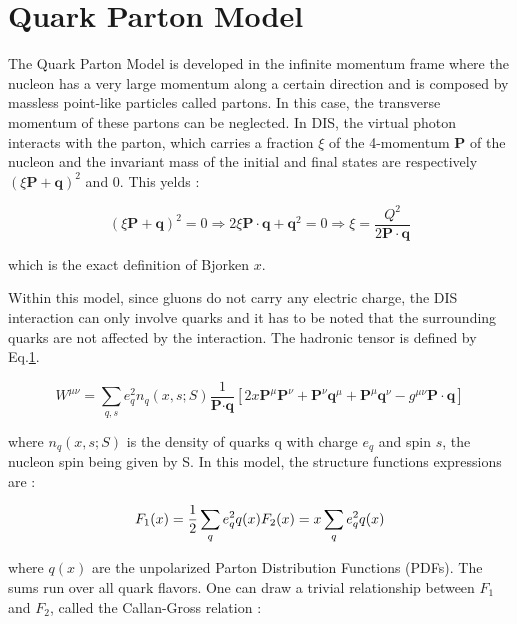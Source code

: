 
\section{Quark Parton Model}

The Quark Parton Model is developed in the infinite momentum frame where the nucleon has a very large momentum
along a certain direction and is composed by massless point-like particles called partons. In this case, the
transverse momentum of these partons can be neglected. In DIS, the virtual photon interacts with the parton,
which carries a fraction $\xi$ of the 4-momentum \textbf{P} of the nucleon and the invariant mass of the initial
and final states are respectively $(\xi\textbf{P}+\textbf{q})^2$ and 0. This yelds :

\begin{equation}
  (\xi\textbf{P}+\textbf{q})^2 = 0 \Rightarrow 2\xi\textbf{P}\cdot\textbf{q}+\textbf{q}^2 = 0 \Rightarrow \xi = \frac{Q^2}{2\textbf{P}\cdot\textbf{q}}
\end{equation}

which is the exact definition of Bjorken $x$.

Within this model, since gluons do not carry any electric charge, the DIS interaction can only involve quarks and
it has to be noted that the surrounding quarks are not affected by the interaction. The hadronic tensor is defined
by Eq.\ref{}.

\begin{equation}
  W^{\mu\nu} = \sum\limits_{q,s}e^2_qn_q(x,s;S)\frac{1}{\textbf{P}\cdot\textbf{q}}[2x\textbf{P}^{\mu}\textbf{P}^{\nu}
  +\textbf{P}^{\nu}\textbf{q}^{\mu}+\textbf{P}^{\mu}\textbf{q}^{\nu}-g^{\mu\nu}\textbf{P}\cdot\textbf{q}]
\end{equation}

where $n_q(x,s;S)$ is the density of quarks q with charge $e_q$ and spin $s$, the nucleon spin being given by S.
In this model, the structure functions expressions are :

\begin{equation}
  F_1(x)=\frac{1}{2}\sum\limits_{q}e^2_qq(x) \\
  F_2(x)=x\sum\limits_{q}e^2_qq(x)
\end{equation}

where $q(x)$ are the unpolarized Parton Distribution Functions (PDFs). The sums run over all quark flavors.
One can draw a trivial relationship between $F_1$ and $F_2$, called the Callan-Gross relation :

